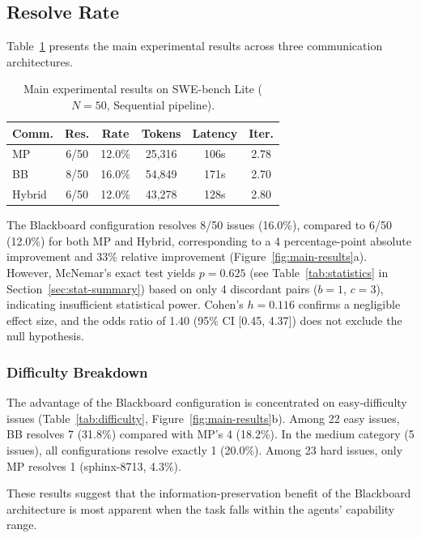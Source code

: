 \documentclass{ieeeaccess}
\begin{document}
\subsection{Resolve Rate}

Table~\ref{tab:main-results} presents the main experimental results across three communication architectures.

\begin{table}[!ht]
\centering
\caption{Main experimental results on SWE-bench Lite ($N=50$, Sequential pipeline).}
\label{tab:main-results}
\small
\begin{tabular}{lccccc}
\toprule
\textbf{Comm.} & \textbf{Res.} & \textbf{Rate} & \textbf{Tokens} & \textbf{Latency} & \textbf{Iter.} \\
\midrule
MP & 6/50 & 12.0\% & 25,316 & 106s & 2.78 \\
BB & 8/50 & 16.0\% & 54,849 & 171s & 2.70 \\
Hybrid & 6/50 & 12.0\% & 43,278 & 128s & 2.80 \\
\bottomrule
\end{tabular}
\end{table}

The Blackboard configuration resolves 8/50 issues (16.0\%), compared to 6/50 (12.0\%) for both MP and Hybrid, corresponding to a 4 percentage-point absolute improvement and 33\% relative improvement (Figure~\ref{fig:main-results}a). However, McNemar's exact test yields $p=0.625$ (see Table~\ref{tab:statistics} in Section~\ref{sec:stat-summary}) based on only 4 discordant pairs ($b=1$, $c=3$), indicating insufficient statistical power. Cohen's $h = 0.116$ confirms a negligible effect size, and the odds ratio of 1.40 (95\% CI [0.45, 4.37]) does not exclude the null hypothesis.

\subsubsection{Difficulty Breakdown}

The advantage of the Blackboard configuration is concentrated on easy-difficulty issues (Table~\ref{tab:difficulty}, Figure~\ref{fig:main-results}b). Among 22 easy issues, BB resolves 7 (31.8\%) compared with MP's 4 (18.2\%). In the medium category (5 issues), all configurations resolve exactly 1 (20.0\%). Among 23 hard issues, only MP resolves 1 (sphinx-8713, 4.3\%).

These results suggest that the information-preservation benefit of the Blackboard architecture is most apparent when the task falls within the agents' capability range.
\end{document}
